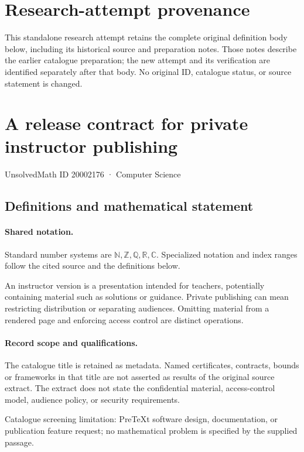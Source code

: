 \documentclass[11pt]{article}
\begin{document}
\section*{Research-attempt provenance}
This standalone research attempt retains the complete original definition body below,
including its historical source and preparation notes. Those notes describe the
earlier catalogue preparation; the new attempt and its verification are identified
separately after that body. No original ID, catalogue status, or source statement is changed.

\section{A release contract for private instructor publishing}\label{20002176}
{\small UnsolvedMath ID 20002176 · Computer Science}
\subsection{Definitions and mathematical statement}

\paragraph{Shared notation.}Standard number systems are $\mathbb N,\mathbb Z,\mathbb Q,\mathbb R,\mathbb C$. Specialized notation and index ranges follow the cited source and the definitions below.


An instructor version is a presentation intended for teachers, potentially containing material such as solutions or guidance. Private publishing can mean restricting distribution or separating audiences. Omitting material from a rendered page and enforcing access control are distinct operations.
\paragraph{Record scope and qualifications.}
The catalogue title is retained as metadata. Named certificates, contracts, bounds or frameworks in that title are not asserted as results of the original source extract.
The extract does not state the confidential material, access-control model, audience policy, or security requirements.

Catalogue screening limitation: PreTeXt software design, documentation, or publication feature request; no mathematical problem is specified by the supplied passage.
\end{document}
